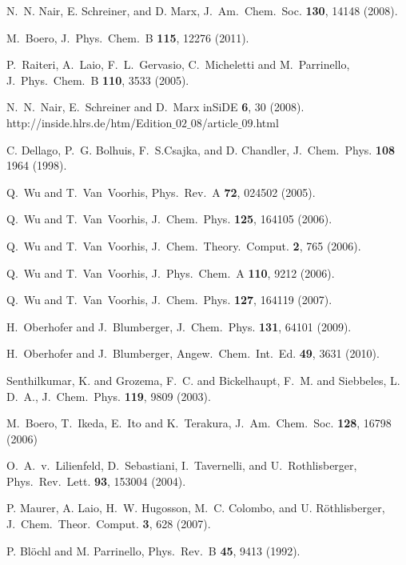 \documentclass[twoside,10pt,titlepage,a4paper]{article}
\begin{document}
\begin{thebibliography}{999}
 N.~N. Nair, E. Schreiner, and D. Marx,
     J.~Am.~Chem.~Soc. {\bf 130}, 14148 (2008).

 M.~Boero, J.~Phys.~Chem.~B {\bf 115}, 12276 (2011).

 P.~Raiteri, A.~Laio, F.~L.~Gervasio, C.~Micheletti and M.~Parrinello,
      J.~Phys.~Chem.~B {\bf 110}, 3533 (2005).

 N.~N.~Nair, E.~Schreiner and D.~Marx
      inSiDE {\bf 6}, 30 (2008).\\
      http://inside.hlrs.de/htm/Edition$\_02\_08$/article$\_09$.html

 C. Dellago, P.~G. Bolhuis, F.~S.Csajka, and D. Chandler,
      J.~Chem.~Phys. {\bf 108} 1964 (1998).

    Q.~Wu and T.~{Van~Voorhis},
    Phys.~Rev.~A     {\bf 72}, 024502 (2005).

    Q.~Wu and T.~{Van~Voorhis},
    J.~Chem.~Phys.  {\bf 125}, 164105 (2006).

    Q.~Wu and T.~{Van~Voorhis},
    J.~Chem.~Theory.~Comput. {\bf 2}, 765 (2006).

    Q.~Wu and T.~{Van~Voorhis},
    J.~Phys.~Chem.~A  {\bf 110}, 9212 (2006).

    Q.~Wu and T.~{Van~Voorhis},
    J.~Chem.~Phys.    {\bf 127}, 164119 (2007).

    H.~Oberhofer and J.~Blumberger,
    J.~Chem.~Phys. {\bf 131}, 64101 (2009).

    H.~Oberhofer and J.~Blumberger,
    Angew.~Chem.~Int.~Ed. {\bf 49}, 3631 (2010).

    Senthilkumar, K. and Grozema, F.~C. and Bickelhaupt, F.~M. and Siebbeles, L. D.~A.,
    J.~Chem.~Phys. {\bf 119}, 9809 (2003).

    M.~Boero, T.~Ikeda, E.~Ito and K.~Terakura,
    J.~Am.~Chem.~Soc. {\bf 128}, 16798 (2006)

    O.~A.~v.~Lilienfeld, D.~Sebastiani, I.~Tavernelli, and U.~Rothlisberger,
    Phys.~Rev.~Lett. {\bf 93}, 153004 (2004).

    P. Maurer, A. Laio, H.~W. Hugosson, M.~C. Colombo, and U. R\"othlisberger,
    J.~Chem.~Theor.~Comput. {\bf 3}, 628 (2007).  

       P. Bl{\"o}chl and M. Parrinello,
      Phys.~Rev.~B {\bf 45}, 9413 (1992).


\end{thebibliography}
\end{document}
